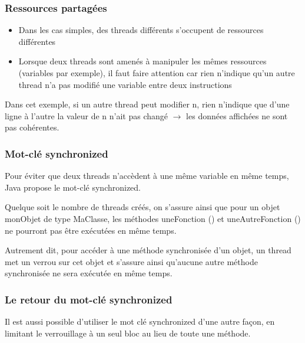 \documentclass{beamer}
\begin{document}
\begin{frame}
  \frametitle{Ressources partagées}
  \begin{itemize}
  \item Dans les cas simples, des threads différents s'occupent de
    ressources différentes
  \item Lorsque deux threads sont amenés à manipuler les mêmes
    ressources (variables par exemple), il faut faire attention car
    rien n'indique qu'un autre thread n'a pas modifié une variable
    entre deux instructions
  \end{itemize}

Dans cet exemple, si un autre thread peut modifier n, rien n'indique
que d'une ligne à l'autre la valeur de n n'ait pas changé $\rightarrow$ les données affichées ne sont pas cohérentes.
\end{frame}

\begin{frame}
  \frametitle{Mot-clé synchronized}
Pour éviter que deux threads n'accèdent à une même variable en même
temps, Java propose le mot-clé synchronized.
    

Quelque soit le nombre de threads créés, on s'assure ainsi que
  pour un objet monObjet de type MaClasse, les méthodes uneFonction ()
  et uneAutreFonction () ne pourront pas être exécutées en même temps.

Autrement dit, pour accéder à une méthode synchronisée d'un objet, un
thread met un verrou sur cet objet et s'assure ainsi qu'aucune autre
méthode synchronisée ne sera exécutée en même temps. 
\end{frame}

\begin{frame}
  \frametitle{Le retour du mot-clé synchronized}
  Il est aussi possible d'utiliser le mot clé synchronized d'une autre
  façon, en limitant le verrouillage à un seul bloc au lieu de toute
  une méthode.
  
\end{frame}
\end{document}
